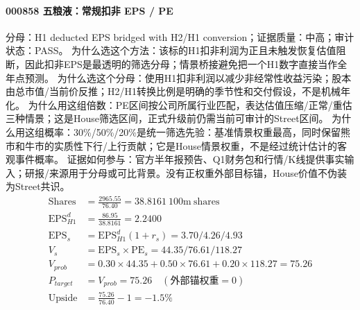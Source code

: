 \paragraph{000858 五粮液：常规扣非 EPS / PE}
分母：H1 deducted EPS bridged with H2/H1 conversion；证据质量：中高；审计状态：PASS。
为什么选这个方法：该标的H1扣非利润为正且未触发恢复估值阻断，因此扣非EPS是最透明的筛选分母；情景桥接避免把一个H1数字直接当作全年点预测。
为什么选这个分母：使用H1扣非利润以减少非经常性收益污染；股本由总市值/当前价反推；H2/H1转换比例是明确的季节性和交付假设，不是机械年化。
为什么用这组倍数：PE区间按公司所属行业匹配，表达估值压缩/正常/重估三种情景；这是House筛选区间，正式升级前仍需当前可审计的Street区间。
为什么用这组概率：30\%/50\%/20\%是统一筛选先验：基准情景权重最高，同时保留熊市和牛市的实质性下行/上行贡献；它是House情景权重，不是经过统计估计的客观事件概率。
证据如何参与：官方半年报预告、Q1财务包和行情/K线提供事实输入；研报/来源用于分母或可比背景。没有正权重外部目标锚，House价值不伪装为Street共识。
\begin{align*}
\mathrm{Shares} &= \frac{2965.55}{76.40}=38.8161\ \mathrm{100m\ shares}\\
\mathrm{EPS}_{H1}^d &= \frac{86.95}{38.8161}=2.2400\\
\mathrm{EPS}_s &= \mathrm{EPS}_{H1}^d(1+r_s)=3.70/4.26/4.93\\
V_s &= \mathrm{EPS}_s\times \mathrm{PE}_s=44.35/76.61/118.27\\
V_{prob} &= 0.30\times 44.35+0.50\times 76.61+0.20\times 118.27=75.26\\
P_{target} &= V_{prob}=75.26\quad(\text{外部锚权重}=0)\\
\mathrm{Upside} &= \frac{75.26}{76.40}-1=-1.5\%\\
\end{align*}

